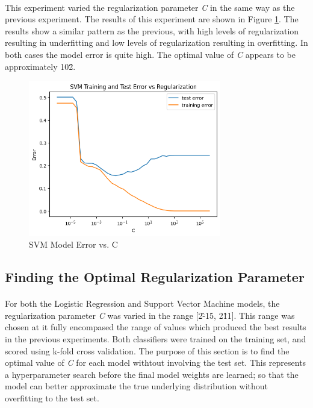 \documentclass[12pt, letterpaper]{article}
\begin{document}
\paragraph*{}This experiment varied the regularization parameter \textit{C} in
the same way as the previous experiment. The results of this experiment are shown
in Figure \ref{fig:5}. The results show a similar pattern as the previous, with
high levels of regularization resulting in underfitting and low levels of regularization
resulting in overfitting. In both cases the model error is quite high.
The optimal value of \textit{C} appears to be approximately 10\^2.

\begin{figure}[ht]
    \centering
    \includegraphics[width=0.75\textwidth]{3.png}
    \caption{SVM Model Error vs. C}
    \label{fig:5}
\end{figure}

\subsection{Finding the Optimal Regularization Parameter}

\paragraph*{}For both the Logistic Regression and Support Vector Machine models,
the regularization parameter \textit{C} was varied in the range [2\^-15, 2\^11].
This range was chosen at it fully encompased the range of values which produced
the best results in the previous experiments. Both classifiers were trained on 
the training set, and scored using k-fold cross validation. The purpose of this
section is to find the optimal value of \textit{C} for each model withtout 
involving the test set. This represents a hyperparameter search before 
the final model weights are learned; so that the model can better approximate
the true underlying distribution without overfitting to the test set.
\end{document}
